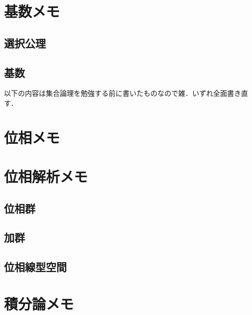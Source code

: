 \documentclass[a4j,10.5pt,oneside,openany]{jsbook}
\theoremstyle{mystyle}
\begin{document}
\chapter{基数メモ}
	\section{選択公理}
		
	\section{基数}
		
		

\newpage	
以下の内容は集合論理を勉強する前に書いたものなので雑．いずれ全面書き直す．
\chapter{位相メモ}
	
	
	
	
	
	
	
	
	

\chapter{位相解析メモ}
	\section{位相群}
		
	\section{加群}
		
	\section{位相線型空間}
		
		
		
		
		

\chapter{積分論メモ}
	
	
	
	
	
	
	
	
	
\end{document}
